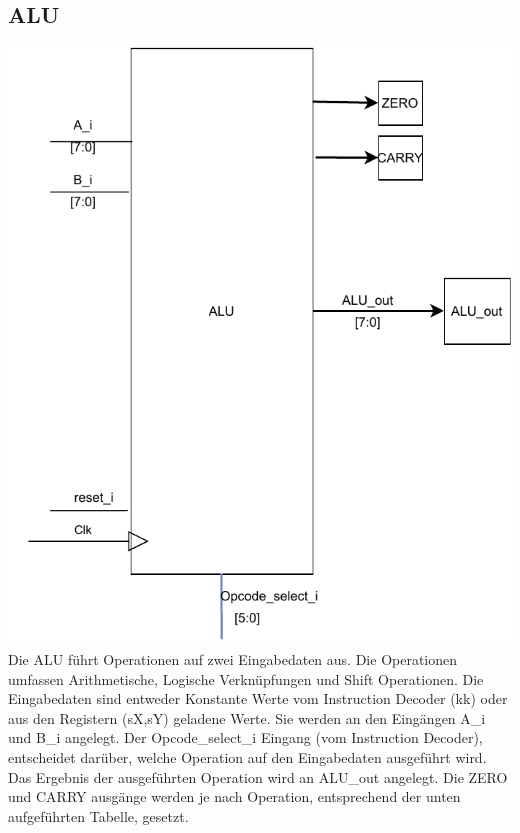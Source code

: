 \documentclass{scrartcl}
\begin{document}
\subsection{ALU}
\includegraphics[height=0.7\textwidth, angle=0]{ALU_beschreibung.pdf}\\
Die ALU führt Operationen auf zwei Eingabedaten aus. Die Operationen umfassen Arithmetische, Logische Verknüpfungen und Shift Operationen. Die Eingabedaten sind entweder Konstante Werte vom Instruction Decoder (kk) oder aus den Registern (sX,sY) geladene Werte. Sie werden an den Eingängen A\_i und B\_i angelegt. Der Opcode\_select\_i Eingang (vom Instruction Decoder), entscheidet darüber, welche Operation auf den Eingabedaten ausgeführt wird. Das Ergebnis der ausgeführten Operation wird an ALU\_out angelegt.
Die ZERO und CARRY ausgänge werden je nach Operation, entsprechend der unten aufgeführten Tabelle, gesetzt.
\end{document}

